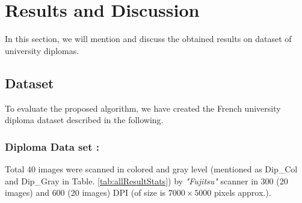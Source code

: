 \documentclass[runningheads]{llncs}
\begin{document}
% 		

\section {Results and Discussion }
\label{results}
In this section, we will mention and discuss the obtained results on dataset of university diplomas.  
\subsection{Dataset}
To evaluate the proposed algorithm, we have created the French university diploma dataset described in the following.
\subsubsection{Diploma Data set : }  
Total $40$ images were scanned in colored  and gray level (mentioned as Dip\_Col and Dip\_Gray in Table. \ref{tab:allResultStats}) by \textit{"Fujitsu"} scanner in $300$ (20 images) and $600$ (20 images) DPI (of size is $7000 \times 5000$ pixels approx.). 
\end{document}
